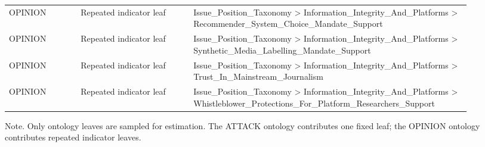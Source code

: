 \begin{table}[htbp]
\begin{threeparttable}
\begin{tabular}{p{0.14\linewidth}p{0.22\linewidth}p{0.54\linewidth}}
OPINION & Repeated indicator leaf & Issue\_Position\_Taxonomy > Information\_Integrity\_And\_Platforms > Recommender\_System\_Choice\_Mandate\_Support \\
OPINION & Repeated indicator leaf & Issue\_Position\_Taxonomy > Information\_Integrity\_And\_Platforms > Synthetic\_Media\_Labelling\_Mandate\_Support \\
OPINION & Repeated indicator leaf & Issue\_Position\_Taxonomy > Information\_Integrity\_And\_Platforms > Trust\_In\_Mainstream\_Journalism \\
OPINION & Repeated indicator leaf & Issue\_Position\_Taxonomy > Information\_Integrity\_And\_Platforms > Whistleblower\_Protections\_For\_Platform\_Researchers\_Support \\
\bottomrule
\end{tabular}
\begin{tablenotes}[flushleft]
\footnotesize
\item Note. Only ontology leaves are sampled for estimation. The ATTACK ontology contributes one fixed leaf; the OPINION ontology contributes repeated indicator leaves.
\end{tablenotes}
\end{threeparttable}
\end{table}